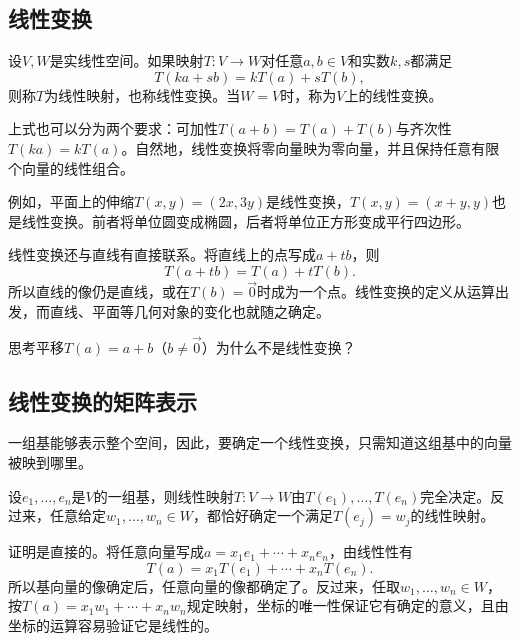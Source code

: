 \subsection{线性变换}
\begin{definition}\label{def:linmap}
设\(V , W\)是实线性空间。如果映射\(T : V \longrightarrow W\)对任意\(a , b \in V\)和实数\(k , s\)都满足
\begin{equation}
    T \left( k a + s b \right) = k T \left( a \right) + s T \left( b \right) ,
\end{equation}
则称\(T\)为线性映射，也称线性变换。当\(W = V\)时，称为\(V\)上的线性变换。
\end{definition}

上式也可以分为两个要求：可加性\(T \left( a + b \right) = T \left( a \right) + T \left( b \right)\)与齐次性\(T \left( k a \right) = k T \left( a \right)\)。自然地，线性变换将零向量映为零向量，并且保持任意有限个向量的线性组合。

例如，平面上的伸缩\(T \left( x , y \right) = \left( 2 x , 3 y \right)\)是线性变换，\(T \left( x , y \right) = \left( x + y , y \right)\)也是线性变换。前者将单位圆变成椭圆，后者将单位正方形变成平行四边形。

线性变换还与直线有直接联系。将直线上的点写成\(a + t b\)，则
\begin{equation}
    T \left( a + t b \right) = T \left( a \right) + t T \left( b \right) .
\end{equation}
所以直线的像仍是直线，或在\(T \left( b \right) = \vec{0}\)时成为一个点。线性变换的定义从运算出发，而直线、平面等几何对象的变化也就随之确定。

{\kaiti{}思考\quad 平移\(T \left( a \right) = a + b\)（\(b \ne \vec{0}\)）为什么不是线性变换？}

\subsection{线性变换的矩阵表示}
一组基能够表示整个空间，因此，要确定一个线性变换，只需知道这组基中的向量被映到哪里。

\begin{theorem}\label{thm:linmap-basis}
设\(e_{1} , \ldots , e_{n}\)是\(V\)的一组基，则线性映射\(T : V \longrightarrow W\)由\(T \left( e_{1} \right) , \ldots , T \left( e_{n} \right)\)完全决定。反过来，任意给定\(w_{1} , \ldots , w_{n} \in W\)，都恰好确定一个满足\(T \left( e_{j} \right) = w_{j}\)的线性映射。
\end{theorem}

证明是直接的。将任意向量写成\(a = x_{1} e_{1} + \cdots + x_{n} e_{n}\)，由线性性有
\begin{equation}\label{eq:linmap-basis-expansion}
    T \left( a \right) = x_{1} T \left( e_{1} \right) + \cdots + x_{n} T \left( e_{n} \right) .
\end{equation}
所以基向量的像确定后，任意向量的像都确定了。反过来，任取\(w_{1} , \ldots , w_{n} \in W\)，按\(T \left( a \right) = x_{1} w_{1} + \cdots + x_{n} w_{n}\)规定映射，坐标的唯一性保证它有确定的意义，且由坐标的运算容易验证它是线性的。


